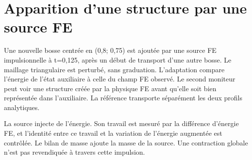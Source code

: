 \documentclass[10pt,a4paper]{article}
\begin{document}
\section{Apparition d'une structure par une source FE}
Une nouvelle bosse centrée en (0,8; 0,75) est ajoutée par une source FE impulsionnelle à t=0,125, après un début de transport d'une autre bosse. Le maillage triangulaire est perturbé, sans graduation. L'adaptation compare l'énergie de l'état auxiliaire à celle du champ FE observé. Le second moniteur peut voir une structure créée par la physique FE avant qu'elle soit bien représentée dans l'auxiliaire. La référence transporte séparément les deux profils analytiques.

La source injecte de l'énergie. Son travail est mesuré par la différence d'énergie FE, et l'identité entre ce travail et la variation de l'énergie augmentée est contrôlée. Le bilan de masse ajoute la masse de la source. Une contraction globale n'est pas revendiquée à travers cette impulsion.
\end{document}
